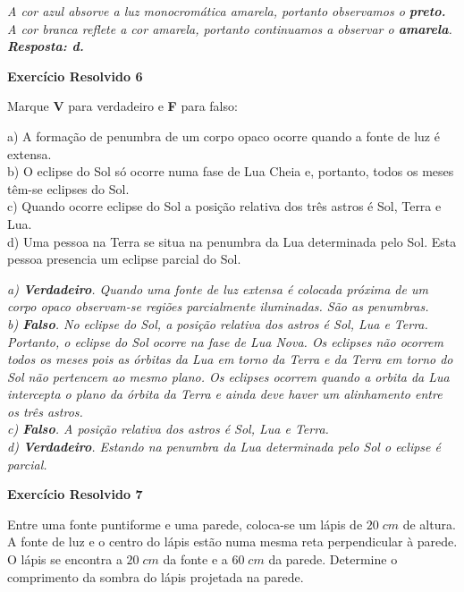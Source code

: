 \documentclass[11pt,twocolumn,oneside]{article}
\newenvironment{resposta*}
  {\bf Resposta:\\ }
  {}
\begin{document}
\begin{resposta*}
{\it A cor azul absorve a luz monocromática amarela, portanto observamos o \textbf{preto.} A cor branca reflete a cor amarela, portanto continuamos a observar o \textbf{amarela}. \\
\textbf{Resposta: d.}}
\end{resposta*}

\textbf{Exercício Resolvido 6}


Marque \textbf{V} para verdadeiro e \textbf{F} para falso:


a) A formação de penumbra de um corpo opaco ocorre quando a fonte de luz é extensa. \\
b) O eclipse do Sol só ocorre numa fase de Lua Cheia e, portanto, todos os meses têm-se eclipses do Sol. \\
c) Quando ocorre eclipse do Sol a posição relativa dos três astros é Sol, Terra e Lua. \\
d) Uma pessoa na Terra se situa na penumbra da Lua determinada pelo Sol. Esta pessoa presencia um eclipse parcial do Sol. \\


\begin{resposta*}
{\it a) \textbf{Verdadeiro}. Quando uma fonte de luz extensa é colocada próxima de um corpo opaco observam-se regiões parcialmente iluminadas. São as penumbras. \\
b) \textbf{Falso}. No eclipse do Sol, a posição relativa dos astros é Sol, Lua e Terra. Portanto, o eclipse do Sol ocorre na fase de Lua Nova. Os eclipses não ocorrem todos os meses pois as órbitas da Lua em torno da Terra e da Terra em torno do Sol não pertencem ao mesmo plano. Os eclipses ocorrem quando a orbita da Lua intercepta o plano da órbita da Terra e ainda deve haver um alinhamento entre os três astros. \\
c) \textbf{Falso}. A posição relativa dos astros é Sol, Lua e Terra. \\
d) \textbf{Verdadeiro}. Estando na penumbra da Lua determinada pelo Sol o eclipse é parcial. \\}
\end{resposta*}

\textbf{Exercício Resolvido 7}


Entre uma fonte puntiforme e uma parede, coloca-se um lápis de $20\;cm$ de altura. A fonte de luz e o centro do lápis estão numa mesma reta perpendicular à parede. O lápis se encontra a $20\;cm$ da fonte e a $60\;cm$ da parede. Determine o comprimento da sombra do lápis projetada na parede.
\end{document}
